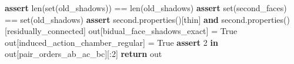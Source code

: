 \documentclass[
  10pt,
  letterpaper,
]{article}
\newenvironment{Shaded}{}{}
\newcommand{\BuiltInTok}[1]{\textcolor[rgb]{0.00,0.50,0.00}{#1}}
\newcommand{\ControlFlowTok}[1]{\textcolor[rgb]{0.00,0.44,0.13}{\textbf{#1}}}
\newcommand{\DecValTok}[1]{\textcolor[rgb]{0.25,0.63,0.44}{#1}}
\newcommand{\KeywordTok}[1]{\textcolor[rgb]{0.00,0.44,0.13}{\textbf{#1}}}
\newcommand{\NormalTok}[1]{#1}
\newcommand{\OperatorTok}[1]{\textcolor[rgb]{0.40,0.40,0.40}{#1}}
\newcommand{\StringTok}[1]{\textcolor[rgb]{0.25,0.44,0.63}{#1}}
\newcommand{\VariableTok}[1]{\textcolor[rgb]{0.10,0.09,0.49}{#1}}
\begin{document}
\begin{Shaded}
\begin{Highlighting}[]
        \ControlFlowTok{assert} \BuiltInTok{len}\NormalTok{(}\BuiltInTok{set}\NormalTok{(old\_shadows)) }\OperatorTok{==} \BuiltInTok{len}\NormalTok{(old\_shadows)}
        \ControlFlowTok{assert} \BuiltInTok{set}\NormalTok{(second\_faces) }\OperatorTok{==} \BuiltInTok{set}\NormalTok{(old\_shadows)}
        \ControlFlowTok{assert}\NormalTok{ second.properties()[}\StringTok{\textquotesingle{}thin\textquotesingle{}}\NormalTok{] }\KeywordTok{and}\NormalTok{ second.properties()[}\StringTok{\textquotesingle{}residually\_connected\textquotesingle{}}\NormalTok{]}
\NormalTok{        out[}\StringTok{\textquotesingle{}bidual\_face\_shadows\_exact\textquotesingle{}}\NormalTok{] }\OperatorTok{=} \VariableTok{True}
\NormalTok{        out[}\StringTok{\textquotesingle{}induced\_action\_chamber\_regular\textquotesingle{}}\NormalTok{] }\OperatorTok{=} \VariableTok{True}
        \ControlFlowTok{assert} \DecValTok{2} \KeywordTok{in}\NormalTok{ out[}\StringTok{\textquotesingle{}pair\_orders\_ab\_ac\_bc\textquotesingle{}}\NormalTok{][:}\DecValTok{2}\NormalTok{]}
    \ControlFlowTok{return}\NormalTok{ out}



\end{Highlighting}
\end{Shaded}
\end{document}

